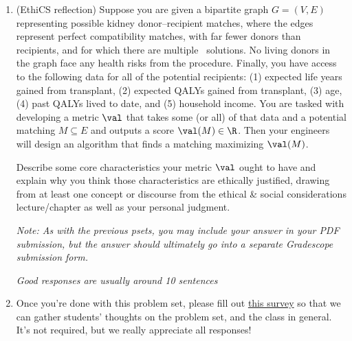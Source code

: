 \documentclass[11pt]{article}
\newcounter{chapter}
\begin{document}
\begin{enumerate}
 \item (EthiCS reflection) Suppose you are given a bipartite graph $G=(V,E)$ representing possible kidney donor--recipient matches, where the edges represent perfect compatibility matches, with far fewer donors than recipients, and for which there are multiple \MaximumMatching\ solutions. No living donors in the graph face any health risks from the procedure. Finally, you have access to the following data for all of the potential recipients: (1) expected life years gained from transplant, (2) expected QALYs gained from transplant, (3) age, (4) past QALYs lived to date, and (5) household income. You are tasked with developing a metric $\val$ that takes some (or all) of that data
 and a potential matching $M\subseteq E$ and outputs a score $\val(M)\in \R$.
 Then your engineers will design an algorithm that finds a matching maximizing $\val(M)$.

 Describe some core characteristics your metric $\val$ ought to have and explain why you think those characteristics are ethically justified, drawing from at least one concept or discourse from the ethical \& social considerations lecture/chapter as well as your personal judgment.

 \textit{Note: As with the previous psets, you may include your answer in your PDF submission, but the answer should ultimately go into a separate Gradescope submission form.}
 
 \emph{Good responses are usually around 10 sentences}

\item Once you're done with this problem set, please fill out \href{https://forms.gle/qQp9CyLP9T4hMacMA}{this survey} so that we can gather students' thoughts on the problem set, and the class in general. It's not required, but we really appreciate all responses!

\end{enumerate}
\end{document}
